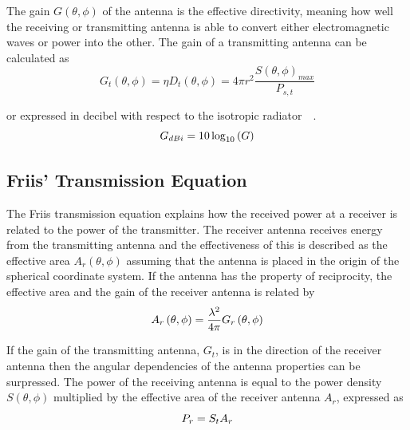 The gain $G \left( \theta, \phi \right)$ of the antenna is the effective directivity, meaning how well the receiving or transmitting antenna is able to convert either electromagnetic waves or power into the other. The gain of a transmitting antenna can be calculated as~\cite[p. 10]{ant_beam_form}
\begin{equation} \label{eq:gain}
    G_t \left( \theta, \phi \right) = \eta  D_t \left(\theta, \phi\right) = 4 \pi r^2 \frac{S \left(\theta, \phi\right)_{max}}{P_{s,t}}
\end{equation}

or expressed in decibel with respect to the isotropic radiator~\cite[p. 10]{ant_beam_form}~\cite[pp. 1.8-1.10]{ant_eng_hk}.
\begin{equation} \label{eq:gain_dbi}
    G_{dBi} = 10 \log_{10}\left(G\right)
    \tagaddtext{[\si{\decibel}]}
\end{equation}

\subsection{Friis' Transmission Equation} \label{ss:friis}
The Friis transmission equation explains how the received power at a receiver is related to the power of the transmitter. The receiver antenna receives energy from the transmitting antenna and the effectiveness of this is described as the effective area $A_r\left( \theta, \phi \right)$ assuming that the antenna is placed in the origin of the spherical coordinate system. If the antenna has the property of reciprocity, the effective area and the gain of the receiver antenna is related by~\cite[p. 1.10]{ant_eng_hk}
\begin{equation} \label{eq:effectivate_area}
    A_r \left( \theta, \phi \right) = \frac{\lambda^2}{4 \pi} G_r \left( \theta, \phi \right)
    \tagaddtext{[\si{\meter\squared}]}
\end{equation}

If the gain of the transmitting antenna, $G_t$, is in the direction of the receiver antenna then the angular dependencies of the antenna properties can be surpressed. The power of the receiving antenna is equal to the power density $S \left(\theta, \phi\right)$ multiplied by the effective area of the receiver antenna $A_r$, expressed as
\begin{equation} \label{eq:receiver_power}
    P_r = S_t A_r
    \tagaddtext{[\si{\watt}]}
\end{equation} 

